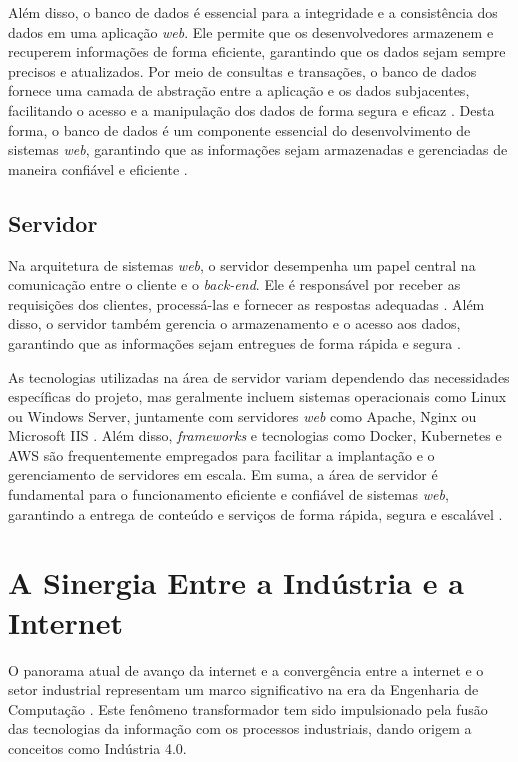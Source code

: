 Além disso, o banco de dados é essencial para a integridade e a consistência dos dados em uma aplicação \textit{web}. Ele permite que os desenvolvedores armazenem e recuperem informações de forma eficiente, garantindo que os dados sejam sempre precisos e atualizados. Por meio de consultas e transações, o banco de dados fornece uma camada de abstração entre a aplicação e os dados subjacentes, facilitando o acesso e a manipulação dos dados de forma segura e eficaz \cite{databasesql}. Desta forma, o banco de dados é um componente essencial do desenvolvimento de sistemas \textit{web}, garantindo que as informações sejam armazenadas e gerenciadas de maneira confiável e eficiente \cite{databasesqlmaster}.

\subsection{Servidor}
    
Na arquitetura de sistemas \textit{web}, o servidor desempenha um papel central na comunicação entre o cliente e o \textit{back-end}. Ele é responsável por receber as requisições dos clientes, processá-las e fornecer as respostas adequadas \cite{serverdummy}. Além disso, o servidor também gerencia o armazenamento e o acesso aos dados, garantindo que as informações sejam entregues de forma rápida e segura \cite{serverhost}.
    
As tecnologias utilizadas na área de servidor variam dependendo das necessidades específicas do projeto, mas geralmente incluem sistemas operacionais como Linux ou Windows Server, juntamente com servidores \textit{web} como Apache, Nginx ou Microsoft IIS \cite{serverapache}. Além disso, \textit{frameworks} e tecnologias como Docker, Kubernetes e AWS são frequentemente empregados para facilitar a implantação e o gerenciamento de servidores em escala. Em suma, a área de servidor é fundamental para o funcionamento eficiente e confiável de sistemas \textit{web}, garantindo a entrega de conteúdo e serviços de forma rápida, segura e escalável \cite{serversql}.
    
\section{A Sinergia Entre a Indústria e a Internet} 

O panorama atual de avanço da internet e a convergência entre a internet e o setor industrial representam um marco significativo na era da Engenharia de Computação \cite{industry4status}. Este fenômeno transformador tem sido impulsionado pela fusão das tecnologias da informação com os processos industriais, dando origem a conceitos como Indústria 4.0. 
    
